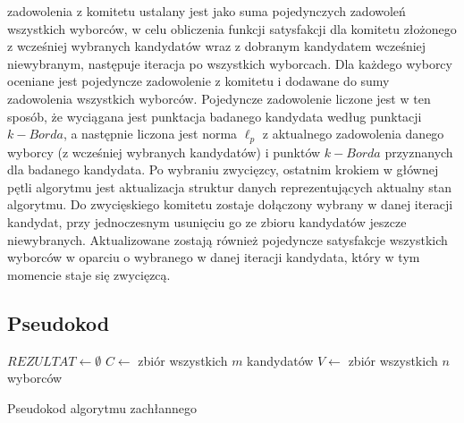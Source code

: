 \documentclass[pdflatex,11pt]{../aghdoc_version2}
\begin{document}
zadowolenia z komitetu ustalany jest jako suma pojedynczych zadowoleń wszystkich
wyborców, w celu obliczenia funkcji satysfakcji dla komitetu złożonego z wcześniej
wybranych kandydatów wraz z dobranym kandydatem wcześniej niewybranym, następuje
iteracja po wszystkich wyborcach. Dla każdego wyborcy oceniane jest pojedyncze
zadowolenie z komitetu i dodawane do sumy zadowolenia wszystkich wyborców.
Pojedyncze zadowolenie liczone jest w ten sposób, że wyciągana jest punktacja badanego
kandydata według punktacji $k-Borda$, a następnie liczona jest norma $\ell_p$ z aktualnego
zadowolenia danego wyborcy (z wcześniej wybranych kandydatów) i punktów $k-Borda$
przyznanych dla badanego kandydata. Po wybraniu zwycięzcy, ostatnim krokiem w głównej
pętli algorytmu jest aktualizacja struktur danych reprezentujących aktualny stan algorytmu.
Do zwycięskiego komitetu zostaje dołączony wybrany w danej iteracji kandydat, przy
jednoczesnym usunięciu go ze zbioru kandydatów jeszcze niewybranych. Aktualizowane
zostają również pojedyncze satysfakcje wszystkich wyborców w oparciu o wybranego w
danej iteracji kandydata, który w tym momencie staje się zwycięzcą.

\subsection{Pseudokod}
\begin{algorithm}[H]
\SetAlgoLined
{}
$REZULTAT \longleftarrow \emptyset $ \;
$C \longleftarrow $ zbiór wszystkich $m$ kandydatów\;
$V \longleftarrow $ zbiór wszystkich $n$ wyborców\;
\caption{Pseudokod algorytmu zachłannego}
\end{algorithm}
\end{document}

